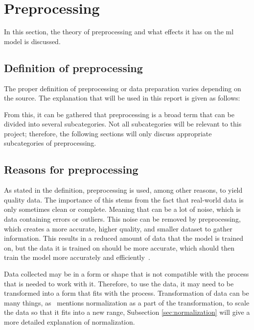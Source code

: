 \section{Preprocessing}\label{sec:preprocessing}
In this section, the theory of preprocessing and what effects it has on the \gls{ml} model is discussed.



\subsection{Definition of preprocessing}\label{subsec:preprocessing-definition}
The proper definition of preprocessing or data preparation varies depending on the source. The explanation that will be used in this report is given as follows:


From this, it can be gathered that preprocessing is a broad term that can be divided into several subcategories. Not all subcategories will be relevant to this project; therefore, the following sections will only discuss appropriate subcategories of preprocessing.
  

\subsection{Reasons for preprocessing}\label{subsec:preprocessing-reasons}
As stated in the definition, preprocessing is used, among other reasons, to yield quality data. The importance of this stems from the fact that real-world data is only sometimes clean or complete. Meaning that can be a lot of noise, which is data containing errors or outliers. This noise can be removed by preprocessing, which creates a more accurate, higher quality, and smaller dataset to gather information. This results in a reduced amount of data that the model is trained on, but the data it is trained on should be more accurate, which should then train the model more accurately and efficiently~\cite{data-preparation-for-data-mining}.


Data collected may be in a form or shape that is not compatible with the process that is needed to work with it. Therefore, to use the data, it may need to be transformed into a form that fits with the process. Transformation of data can be many things, as~\cite{Data-preprocessing-for-flight-delays} mentions normalization as a part of the transformation, to scale the data so that it fits into a new range, Subsection \ref{sec:normalization} will give a more detailed explanation of normalization.

